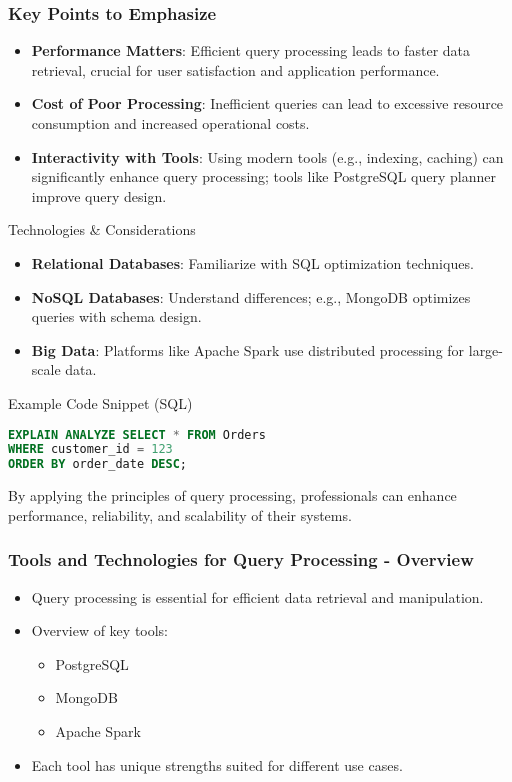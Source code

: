 \documentclass[aspectratio=169]{beamer}
\begin{document}
\begin{frame}[fragile]
    \frametitle{Key Points to Emphasize}
    \begin{itemize}
        \item \textbf{Performance Matters}: Efficient query processing leads to faster data retrieval, crucial for user satisfaction and application performance.
        \item \textbf{Cost of Poor Processing}: Inefficient queries can lead to excessive resource consumption and increased operational costs.
        \item \textbf{Interactivity with Tools}: Using modern tools (e.g., indexing, caching) can significantly enhance query processing; tools like PostgreSQL query planner improve query design.
    \end{itemize}

    \begin{block}{Technologies \& Considerations}
        \begin{itemize}
            \item \textbf{Relational Databases}: Familiarize with SQL optimization techniques.
            \item \textbf{NoSQL Databases}: Understand differences; e.g., MongoDB optimizes queries with schema design.
            \item \textbf{Big Data}: Platforms like Apache Spark use distributed processing for large-scale data.
        \end{itemize}
    \end{block}

    \begin{block}{Example Code Snippet (SQL)}
        \begin{lstlisting}[language=SQL]
EXPLAIN ANALYZE SELECT * FROM Orders 
WHERE customer_id = 123 
ORDER BY order_date DESC;
        \end{lstlisting}
    \end{block}
    
    By applying the principles of query processing, professionals can enhance performance, reliability, and scalability of their systems.
\end{frame}

\begin{frame}[fragile]
    \frametitle{Tools and Technologies for Query Processing - Overview}
    \begin{itemize}
        \item Query processing is essential for efficient data retrieval and manipulation.
        \item Overview of key tools:
        \begin{itemize}
            \item PostgreSQL
            \item MongoDB
            \item Apache Spark
        \end{itemize}
        \item Each tool has unique strengths suited for different use cases.
    \end{itemize}
\end{frame}
\end{document}

